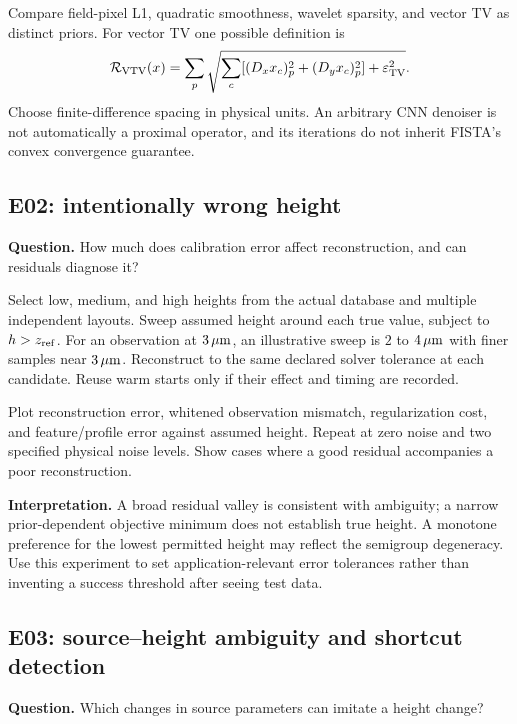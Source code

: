 Compare field-pixel L1, quadratic smoothness, wavelet sparsity, and vector TV as distinct priors. For vector TV one possible definition is
\begin{equation}
 \mathcal R_{\rm VTV}(x)=\sum_p\sqrt{\sum_c[(D_xx_c)_p^2+(D_yx_c)_p^2]+\varepsilon_{\rm TV}^2}.
\end{equation}
Choose finite-difference spacing in physical units. An arbitrary CNN denoiser is not automatically a proximal operator, and its iterations do not inherit FISTA's convex convergence guarantee.


\subsection{E02: intentionally wrong height}
\textbf{Question.} How much does calibration error affect reconstruction, and can residuals diagnose it?

Select low, medium, and high heights from the actual database and multiple independent layouts. Sweep assumed height around each true value, subject to $h>z_{\rm ref}$. For an observation at $3\,\mu\mathrm m$, an illustrative sweep is $2$ to $4\,\mu\mathrm m$ with finer samples near $3\,\mu\mathrm m$. Reconstruct to the same declared solver tolerance at each candidate. Reuse warm starts only if their effect and timing are recorded.

Plot reconstruction error, whitened observation mismatch, regularization cost, and feature/profile error against assumed height. Repeat at zero noise and two specified physical noise levels. Show cases where a good residual accompanies a poor reconstruction.

\textbf{Interpretation.} A broad residual valley is consistent with ambiguity; a narrow prior-dependent objective minimum does not establish true height. A monotone preference for the lowest permitted height may reflect the semigroup degeneracy. Use this experiment to set application-relevant error tolerances rather than inventing a success threshold after seeing test data.

\subsection{E03: source--height ambiguity and shortcut detection}
\textbf{Question.} Which changes in source parameters can imitate a height change?


